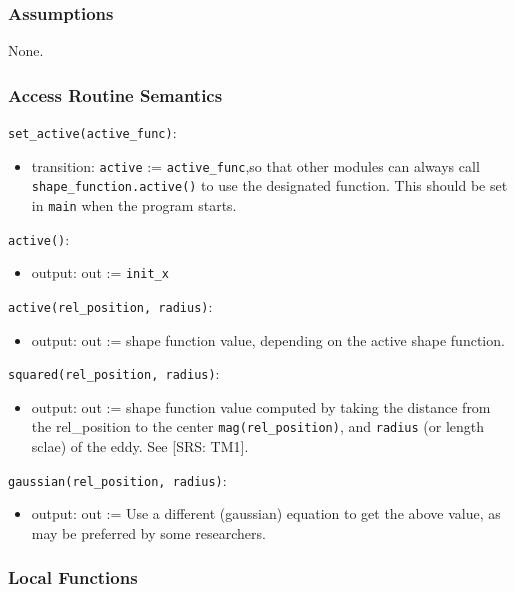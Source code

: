 \documentclass[12pt, titlepage]{article}
\begin{document}
\subsubsection{Assumptions}
None.

\subsubsection{Access Routine Semantics}

\noindent \texttt{set\_active(active\_func)}:
\begin{itemize}
\item transition: \texttt{active} := \texttt{active\_func},\newline so that other modules can always call \texttt{shape\_function.active()} to use the designated function. This should be set in \texttt{main} when the program starts.
\end{itemize}

\noindent \texttt{active()}:
\begin{itemize}
  \item output: out := \texttt{init\_x}
\end{itemize}

\noindent \texttt{active(rel\_position, radius)}:
\begin{itemize}
  \item output: out := shape function value, depending on the active shape function.
\end{itemize}

\noindent \texttt{squared(rel\_position, radius)}:
\begin{itemize}
  \item output: out := shape function value computed by taking the distance from the rel\_position to the center \texttt{mag(rel\_position)}, and \texttt{radius} (or length sclae) of the eddy. See [SRS: TM1].
\end{itemize}

\noindent \texttt{gaussian(rel\_position, radius)}:
\begin{itemize}
  \item output: out := Use a different (gaussian) equation to get the above value, as may be preferred by some researchers.
\end{itemize}

\subsubsection{Local Functions}
\end{document}
